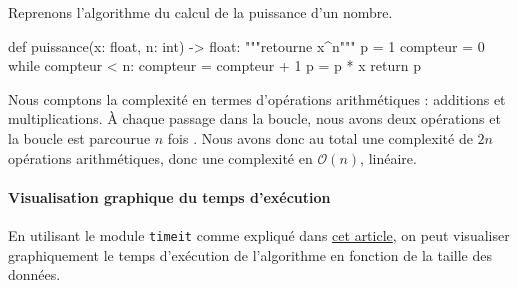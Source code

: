\documentclass[
  a4paper,
  DIV=11,
  numbers=noendperiod]{scrartcl}
\let\oldparagraph\paragraph
\renewcommand{\paragraph}[1]{\oldparagraph{#1}\mbox{}}
\newenvironment{Shaded}{\begin{snugshade}}{\end{snugshade}}
\newcommand{\BuiltInTok}[1]{\textcolor[rgb]{0.00,0.23,0.31}{#1}}
\newcommand{\CommentTok}[1]{\textcolor[rgb]{0.37,0.37,0.37}{#1}}
\newcommand{\ControlFlowTok}[1]{\textcolor[rgb]{0.00,0.23,0.31}{#1}}
\newcommand{\DecValTok}[1]{\textcolor[rgb]{0.68,0.00,0.00}{#1}}
\newcommand{\KeywordTok}[1]{\textcolor[rgb]{0.00,0.23,0.31}{#1}}
\newcommand{\NormalTok}[1]{\textcolor[rgb]{0.00,0.23,0.31}{#1}}
\newcommand{\OperatorTok}[1]{\textcolor[rgb]{0.37,0.37,0.37}{#1}}
\begin{document}
\begin{tcolorbox}[enhanced jigsaw, rightrule=.15mm, opacitybacktitle=0.6, bottomrule=.15mm, toprule=.15mm, breakable, colback=white, colframe=quarto-callout-caution-color-frame, left=2mm, leftrule=.75mm, bottomtitle=1mm, titlerule=0mm, coltitle=black, toptitle=1mm, title=\textcolor{quarto-callout-caution-color}{\faFire}\hspace{0.5em}{Exemple}, arc=.35mm, opacityback=0, colbacktitle=quarto-callout-caution-color!10!white]

Reprenons l'algorithme du calcul de la puissance d'un nombre.

\begin{Shaded}
\begin{Highlighting}[]
\KeywordTok{def}\NormalTok{ puissance(x: }\BuiltInTok{float}\NormalTok{, n: }\BuiltInTok{int}\NormalTok{) }\OperatorTok{{-}\textgreater{}} \BuiltInTok{float}\NormalTok{:}
    \CommentTok{"""retourne x\^{}n"""}
\NormalTok{    p }\OperatorTok{=} \DecValTok{1}
\NormalTok{    compteur }\OperatorTok{=} \DecValTok{0}
    \ControlFlowTok{while}\NormalTok{ compteur }\OperatorTok{\textless{}}\NormalTok{ n:}
\NormalTok{        compteur }\OperatorTok{=}\NormalTok{ compteur }\OperatorTok{+} \DecValTok{1}
\NormalTok{        p }\OperatorTok{=}\NormalTok{ p }\OperatorTok{*}\NormalTok{ x}
    \ControlFlowTok{return}\NormalTok{ p}
\end{Highlighting}
\end{Shaded}

Nous comptons la complexité en termes d'opérations arithmétiques :
additions et multiplications. À chaque passage dans la boucle, nous
avons deux opérations et la boucle est parcourue \(n\) fois . Nous avons
donc au total une complexité de \(2n\) opérations arithmétiques, donc
une complexité en \(\mathcal{O}(n)\), linéaire.

\end{tcolorbox}

\hypertarget{visualisation-graphique-du-temps-dexuxe9cution}{%
\paragraph{Visualisation graphique du temps
d'exécution}\label{visualisation-graphique-du-temps-dexuxe9cution}}

En utilisant le module \texttt{timeit} comme expliqué dans
\href{https://flallemand.fr/blog/posts/timeexec/}{cet article}, on peut
visualiser graphiquement le temps d'exécution de l'algorithme en
fonction de la taille des données.
\end{document}
